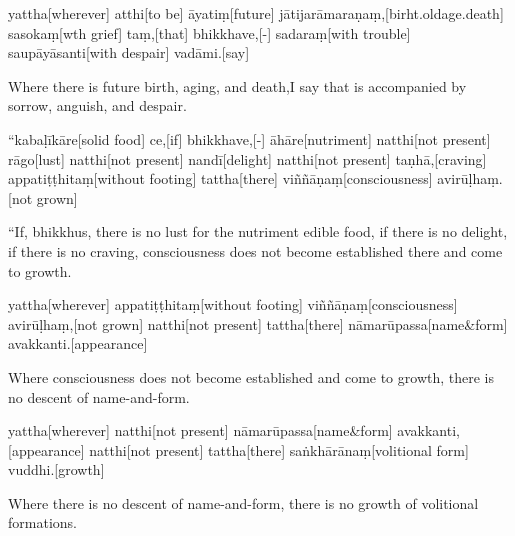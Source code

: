 \begin{samepage}
\begingl[glneveryline={\PaliGlossA,\PaliGlossB}]
yattha[wherever] atthi[to be] āyatiṃ[future] jātijarāmaraṇaṃ,[birht.oldage.death] sasokaṃ[wth grief] taṃ,[that] bhikkhave,[-] sadaraṃ[with trouble] saupāyāsanti[with despair] vadāmi.[say]
\endgl
\nopagebreak
\linespread{0.5}
\begin{spacin}{0.2}
{\PaliGlossFT Where there is future birth, aging, and death,I say that is accompanied by sorrow, anguish, and despair.}
\end{spacin}
\vskip 12pt
\end{samepage}
\vskip 0.2in
\begin{samepage}
\begingl[glneveryline={\PaliGlossA,\PaliGlossB}]
“kabaḷīkāre[solid food] ce,[if] bhikkhave,[-] āhāre[nutriment] natthi[not present] rāgo[lust] natthi[not present] nandī[delight] natthi[not present] taṇhā,[craving] appatiṭṭhitaṃ[without footing] tattha[there] viññāṇaṃ[consciousness] avirūḷhaṃ.[not grown]
\endgl
\nopagebreak
\linespread{0.5}
\begin{spacin}{0.2}
{\PaliGlossFT “If, bhikkhus, there is no lust for the nutriment edible food, if there is no delight, if there is no craving, consciousness does not become established there and come to growth.}
\end{spacin}
\vskip 12pt
\end{samepage}
\begin{samepage}
\begingl[glneveryline={\PaliGlossA,\PaliGlossB}]
yattha[wherever] appatiṭṭhitaṃ[without footing] viññāṇaṃ[consciousness] avirūḷhaṃ,[not grown] natthi[not present] tattha[there] nāmarūpassa[name\&form] avakkanti.[appearance]
\endgl
\nopagebreak
\linespread{0.5}
\begin{spacin}{0.2}
{\PaliGlossFT Where consciousness does not become established and come to growth, there is no descent of name-and-form.}
\end{spacin}
\vskip 12pt
\end{samepage}
\begin{samepage}
\begingl[glneveryline={\PaliGlossA,\PaliGlossB}]
yattha[wherever] natthi[not present] nāmarūpassa[name\&form] avakkanti,[appearance] natthi[not present] tattha[there] saṅkhārānaṃ[volitional form] vuddhi.[growth]
\endgl
\nopagebreak
\linespread{0.5}
\begin{spacin}{0.2}
{\PaliGlossFT Where there is no descent of name-and-form, there is no growth of volitional formations.}
\end{spacin}
\vskip 12pt
\end{samepage}
